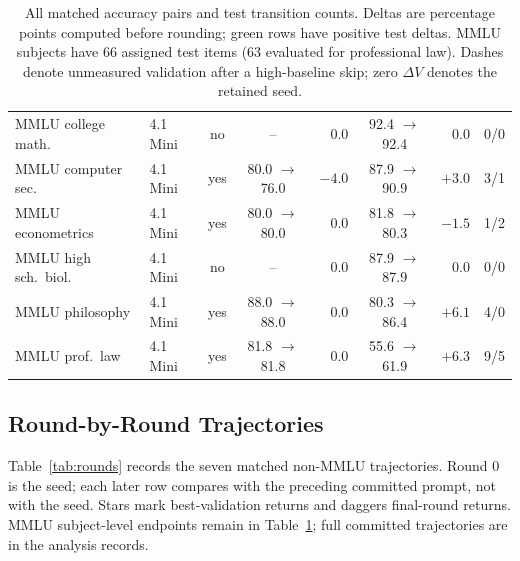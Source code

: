 \documentclass[11pt]{article}
\begin{document}
\begin{table}[htbp]
\begin{tabular}{llccrcrc}
\midrule
MMLU college math. & 4.1 Mini & no & -- & 0.0 & 92.4 $\rightarrow$ 92.4 & 0.0 & 0/0 \\
\rowcolor{softgreen}MMLU computer sec. & 4.1 Mini & yes & 80.0 $\rightarrow$ 76.0 & $-4.0$ & 87.9 $\rightarrow$ 90.9 & $+3.0$ & 3/1 \\
MMLU econometrics & 4.1 Mini & yes & 80.0 $\rightarrow$ 80.0 & 0.0 & 81.8 $\rightarrow$ 80.3 & $-1.5$ & 1/2 \\
MMLU high sch.\ biol. & 4.1 Mini & no & -- & 0.0 & 87.9 $\rightarrow$ 87.9 & 0.0 & 0/0 \\
\rowcolor{softgreen}MMLU philosophy & 4.1 Mini & yes & 88.0 $\rightarrow$ 88.0 & 0.0 & 80.3 $\rightarrow$ 86.4 & $+6.1$ & 4/0 \\
\rowcolor{softgreen}MMLU prof.\ law & 4.1 Mini & yes & 81.8 $\rightarrow$ 81.8 & 0.0 & 55.6 $\rightarrow$ 61.9 & $+6.3$ & 9/5 \\
\bottomrule
\end{tabular}
\caption{All matched accuracy pairs and test transition counts. Deltas are percentage points computed before rounding;
green rows have positive test deltas. MMLU subjects have 66 assigned test items (63 evaluated for professional law).
Dashes denote unmeasured validation after a high-baseline skip; zero $\Delta V$ denotes the retained seed.}
\label{tab:pergap}
\end{table}

\FloatBarrier
\subsection{Round-by-Round Trajectories}
\label{app:rounds}
Table~\ref{tab:rounds} records the seven matched non-MMLU trajectories. Round 0 is the seed; each later row compares
with the preceding committed prompt, not with the seed. Stars mark best-validation returns and daggers final-round
returns. MMLU subject-level endpoints remain in Table~\ref{tab:pergap}; full committed trajectories are in the analysis records.
\end{document}
